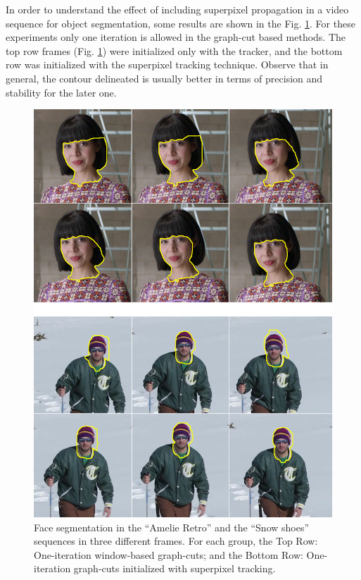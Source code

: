In order to understand the effect of including superpixel propagation in a video sequence for object
segmentation, some results are shown in the Fig. \ref{figurelabel_comp}. For these experiments only one iteration is
allowed in the graph-cut based methods. The top row frames (Fig. \ref{figurelabel_comp}) were initialized only with the tracker, 
and the bottom row was initialized with the superpixel tracking technique. 
Observe that in general, the contour delineated is usually better in terms of precision and
stability for the later one.
   \begin{figure}[thpb]
      \centering
      \includegraphics[width=1.0\textwidth]{../images/Compare.png}
      \caption{Face segmentation in the “Amelie Retro” and the
	      “Snow shoes” sequences in three different frames. For each
	       group, the Top Row: One-iteration window-based graph-cuts;
	       and the Bottom Row: One-iteration graph-cuts initialized with superpixel tracking.}
      \label{figurelabel_comp}
   \end{figure}